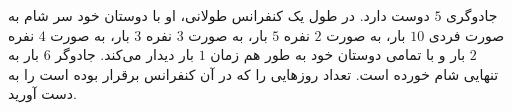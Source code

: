 جادوگری
$5$
دوست دارد. در طول یک کنفرانس طولانی، او با دوستان خود سر شام به صورت فردی
$10$
بار، به صورت
$2$
نفره
$5$
بار، به صورت
$3$
نفره
$3$
بار، به صورت
$4$
نفره
$2$
بار و با تمامی دوستان خود به طور هم زمان
$1$
بار دیدار می‌کند. جادوگر
$6$
بار به تنهایی شام خورده است. تعداد روزهایی را که در آن کنفرانس برقرار بوده است را به دست آورید.